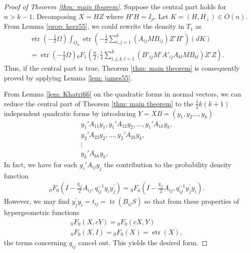 \documentclass[10pt,a4paper]{amsart}
\begin{document}
\begin{proof}[Proof of Theorem \ref{thm: main theorem}]
    Suppose the central part holds for $n > k-1$. Decomposing $ X =  H  Z$ where $ H' H =  I_p$.
    Let $K = (H,H_{\perp}) \in O(n)$. From Lemma \ref{prop: herz55}, we could rewrite the density in $T_1$ as 
    \[\begin{aligned}
        \operatorname{etr} \left(-\frac{1}{2}  \varOmega\right)\int_{O_n}\operatorname{etr}\left(-\frac{1}{2} \sum_{i,j=1}^{k}( A_{ij} M B_{ij})Z'H' \right) (d K) \\
        = \operatorname{etr} \left(-\frac{1}{2}  \varOmega\right){}_{0}F_{1}\left(\frac{n}{2};\frac{1}{4}\sum_{i,j,k,l=1}^{k}( B'_{ij} M'A'_{ij}A_{kl} M B_{kl}) Z'Z\right).    \end{aligned}\]
    Thus, if the central part is true, Theorem \ref{thm: main theorem} is consequently proved by applying Lemma \ref{lem: james55}. 
    
    From Lemma \ref{lem: Khatri66} on the quadratic forms in normal vectors, we can reduce the central part of Theorem \ref{thm: main theorem} to the $\frac{1}{2}k(k+1)$ independent quadratic forms by introducing $ Y =  X B = ( y_{1}, y_{2}\dots,  y_{k})$
    \begin{equation*}
    \begin{aligned}
        {y}_1'{A}_{11}{y}_1, {y}_1'{A}_{12}{y}_2, \dots, {y}_1'{A}_{1k}{y}_k,\\
        {y}_2'{A}_{22}{y}_2, \dots, {y}_2'{A}_{2k}{y}_k, \\
        \vdots\qquad \\
        {y}_k'{A}_{kk}{y}_k,
    \end{aligned}
\end{equation*}
In fact, we have for each ${y}_i'{A}_{ij}{y}_j$ the contribution to the probability density function
\[\begin{aligned}
    {_{0}}F_{0}\left( I - \frac{q_{ij}}{2} A_{ij}, q_{ij}^{-1} y_{i} y_{j}^{\prime}\right) = {_{0}}F_{0}\left( I - \frac{q_{ij}}{2} A_{ij}, q_{ij}^{-1} y_{j}^{\prime} y_{i}\right).\end{aligned}\]
However, we may find $ y_{j}^{\prime} y_{i} = t_{ij} = \operatorname{tr} ( B_{ij} S)$ so that from these properties of hypergeometric functions
\[\begin{aligned}
    {}_{0}F_{0} ( X,c Y) = {}_{0}F_{0} (c X, Y)\\
    {}_{0}F_{0} ( X,  I) = {}_{0}F_{0} ( X) = \operatorname{etr}( X), 
\end{aligned}\]
the terms concerning $q_{ij}$ cancel out. This yields the desired form.
\end{proof}
\end{document}
